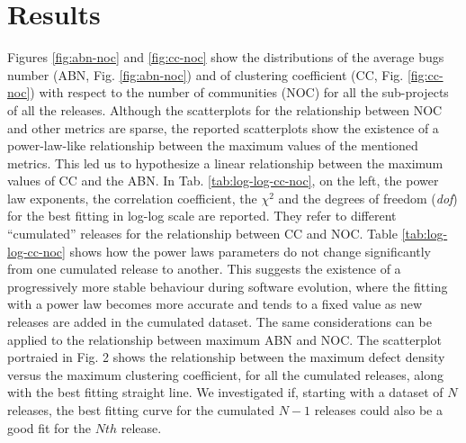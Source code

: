 \section{Results}
\label{Results}

Figures \ref{fig:abn-noc} and \ref{fig:cc-noc} show the distributions of the average bugs number 
(ABN, Fig. \ref{fig:abn-noc}) 
and of clustering coefficient (CC, Fig. \ref{fig:cc-noc}) with respect to the number of communities (NOC) 
for all the sub-projects of all the releases. 
Although the scatterplots for the relationship between NOC %
and other metrics are sparse, the reported scatterplots show the existence
of a power-law-like relationship between the maximum values of the mentioned metrics. 
This led us to hypothesize a linear relationship between the maximum values of 
CC and the ABN. %
In Tab. \ref{tab:log-log-cc-noc}, on the left, the power law exponents, 
the correlation coefficient, the $\chi^2$ and the degrees of freedom (\textit{dof}) for the best fitting in log-log scale are reported. 
They refer to different ``cumulated''
releases for the relationship between CC and NOC. %
Table \ref{tab:log-log-cc-noc} shows how the power laws parameters do not change significantly from one cumulated release to another. 
This suggests the existence of a progressively more stable behaviour during 
software evolution, where the fitting with a power law becomes 
more accurate and tends to a fixed value as new releases are added 
in the cumulated dataset.
The same considerations can be applied to the relationship between maximum ABN 
and NOC. %
The scatterplot portraied in Fig. 2 %
shows the relationship between the maximum defect density versus the maximum clustering coefficient, 
for all the cumulated releases, along with the best fitting straight line.
We investigated if, starting with a dataset of $N$ releases, the best fitting curve for the cumulated $N -1$ releases 
could also be a good fit for the $Nth$ release.
